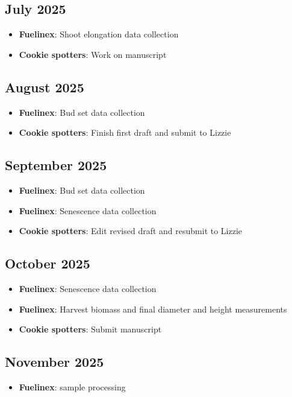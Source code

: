 \documentclass{article}
\begin{document}
\subsection*{July 2025}
\begin{itemize}
    \item \textbf{Fuelinex}: Shoot elongation data collection
    \item \textbf{Cookie spotters}: Work on manuscript
\end{itemize}

\subsection*{August 2025}
\begin{itemize}
    \item \textbf{Fuelinex}: Bud set data collection
    \item \textbf{Cookie spotters}: Finish first draft and submit to Lizzie
\end{itemize}

\subsection*{September 2025}
\begin{itemize}
    \item \textbf{Fuelinex}: Bud set data collection
    \item \textbf{Fuelinex}: Senescence data collection
    \item \textbf{Cookie spotters}: Edit revised draft and resubmit to Lizzie
\end{itemize}

\subsection*{October 2025}
\begin{itemize}
    \item \textbf{Fuelinex}: Senescence data collection
    \item \textbf{Fuelinex}: Harvest biomass and final diameter and height measurements
    \item \textbf{Cookie spotters}: Submit manuscript
\end{itemize}

\subsection*{November 2025}
\begin{itemize}
    \item \textbf{Fuelinex}: sample processing
\end{itemize}
\end{document}
